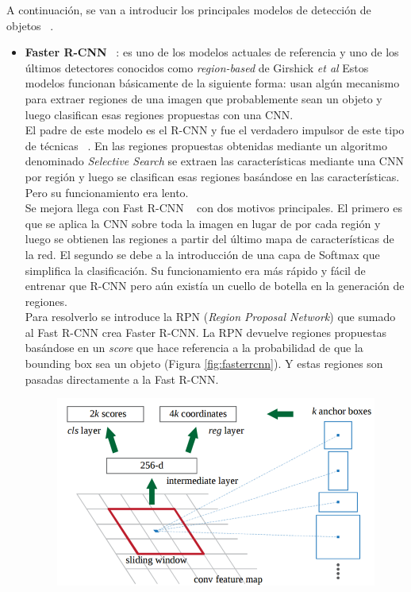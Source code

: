 \documentclass{bmvc2k}
\def\etal{\emph{et al}\bmvaOneDot}
\begin{document}
A continuación, se van a introducir los principales modelos de detección de objetos ~\cite{fu2017dssd}.
\begin{itemize}
\item \textbf{Faster R-CNN} ~\cite{ren2015faster}: es uno de los modelos actuales de referencia y uno de los últimos detectores conocidos como \textit{region-based} de Girshick \etal{} Estos modelos funcionan básicamente de la siguiente forma: usan algún mecanismo para extraer regiones de una imagen que probablemente sean un objeto y luego clasifican esas regiones propuestas con una CNN.\\ El padre de este modelo es el R-CNN y fue el verdadero impulsor de este tipo de técnicas ~\cite{girshick2014rich}. En las regiones propuestas obtenidas mediante un algoritmo denominado \textit{Selective Search} se extraen las características mediante una CNN por región y luego se clasifican esas regiones basándose en las características. Pero su funcionamiento era lento.\\
Se mejora llega con Fast R-CNN ~\cite{girshick2015fast} con dos motivos principales. El primero es que se aplica la CNN sobre toda la imagen en lugar de por cada región y luego se obtienen las regiones a partir del último mapa de características de la red. El segundo se debe a la introducción de una capa de Softmax que simplifica la clasificación. Su funcionamiento era más rápido y fácil de entrenar que R-CNN pero aún existía un cuello de botella en la generación de regiones.\\
Para resolverlo se introduce la RPN (\textit{Region Proposal Network}) que sumado al Fast R-CNN crea Faster R-CNN. La RPN devuelve regiones propuestas basándose en un \textit{score} que hace referencia a la probabilidad de que la bounding box sea un objeto (Figura \ref{fig:fasterrcnn}). Y estas regiones son pasadas directamente a la Fast R-CNN.\\
\begin{figure}[h!]
\begin{center}
\includegraphics[scale=0.25]{faster_rcnn.png}

\end{center}
\end{figure}
\end{itemize}
\end{document}
